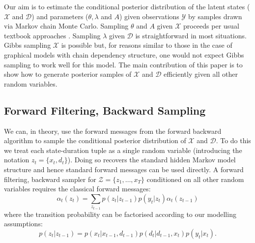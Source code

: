Our aim is to estimate the conditional posterior distribution of the latent states ($\mathcal{X}$ and $\mathcal{D}$) and parameters ($\theta, \lambda$ and $A$) given observations $\mathcal{Y}$ by samples drawn via Markov chain Monte Carlo. Sampling $\theta$ and $A$ given $\mathcal{X}$ proceeds per usual textbook approaches \cite{Bishop06}.  Sampling $\lambda$ given $\mathcal{D}$ is straightforward in most situations.  Gibbs sampling  $\mathcal{X}$ is possible but, for reasons similar to those in the case of graphical models with chain dependency structure, one would not expect Gibbs sampling to work well for this model.  The main contribution of this paper is to show how to generate posterior samples of  $\mathcal{X}$ and $\mathcal{D}$ efficiently given all other random variables.

\subsection{Forward Filtering, Backward Sampling}

We can, in theory, use the forward messages from the forward backward algorithm \cite{Rabiner89} to sample the conditional posterior distribution of $\mathcal{X}$ and $\mathcal{D}.$   To do this we treat each state-duration tuple as a single random variable 
(introducing the notation $z_t = \{x_t,d_t\}$).  
Doing so recovers the standard hidden Markov model structure and hence standard forward messages can be used directly.  A forward filtering, backward sampler for $\mathcal{Z} = \{z_1, \ldots, x_T\}$ conditioned on 
all other random variables
requires the classical forward messages:
    \begin{equation}
        \alpha_t(z_t) = 
        \sum_{z_{t-1}}
        p(z_t | z_{t-1}) 
        p(y_t|z_t) 
        \alpha_t(z_{t-1}) 
        \label{eqn:forward recursion}
    \end{equation}
     where the transition probability can be factorised according to our modelling assumptions:
     \begin{equation}
        p(z_{t} | z_{t-1}) = p(x_t | x_{t-1}, d_{t-1}) p(d_t | d_{t-1}, x_t) p(y_t|x_t).
     \end{equation}

